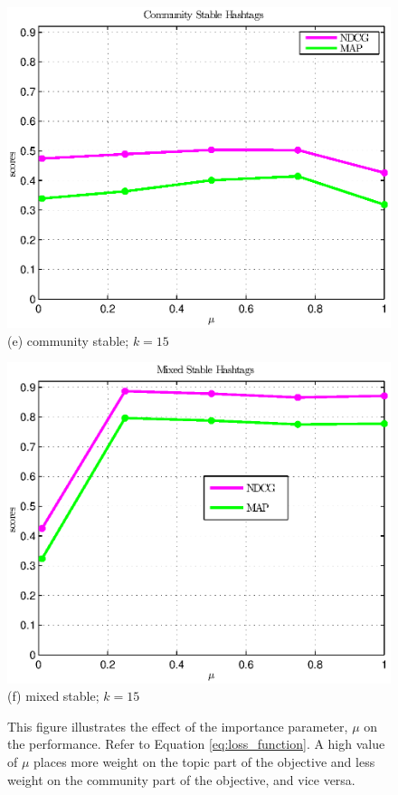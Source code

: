\begin{figure}[!t]
\begin{minipage}{0.310\linewidth}
  \includegraphics[width=1\textwidth]{KDD/images/community_t_15}             
  (e) community stable; $k = 15$
\end{minipage}
\begin{minipage}{0.310\linewidth}
  \centering
  \includegraphics[width=1\textwidth]{KDD/images/mixed_t_15}             
  (f) mixed stable; $k = 15$
\end{minipage}
  \caption[Effect of $\mu$.]{{This figure illustrates the effect of the importance parameter, $\mu$ on the performance.  
Refer to Equation \ref{eq:loss_function}.  A high value of $\mu$ places more weight on the topic part of the objective
and less weight on the community part of the objective, and vice versa.
}}
\label{fig:mu_analysis}
\end{figure}

